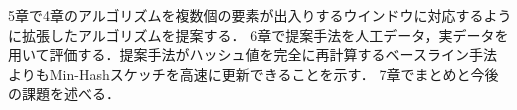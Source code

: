 5章で4章のアルゴリズムを複数個の要素が出入りするウインドウに対応するように拡張したアルゴリズムを提案する．
6章で提案手法を人工データ，実データを用いて評価する．提案手法がハッシュ値を完全に再計算するベースライン手法
よりもMin-Hashスケッチを高速に更新できることを示す．%
7章でまとめと今後の課題を述べる．
